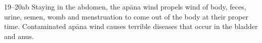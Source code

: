 \begin{translation}
                                    \item[19--20ab] Staying in the abdomen, the apāna wind 
                                    propels wind of body,
                                    feces, urine, semen, womb and menstruation to come 
                                    out of the body at
                                    their proper time. Contaminated apāna wind causes 
                                    terrible diseases that
                                    occur in the bladder and anus.
\end{translation}